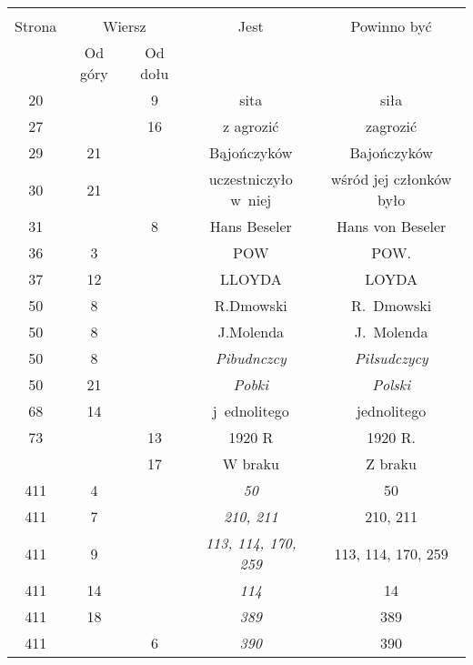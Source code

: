 \documentclass[a4paper,11pt]{article}
\begin{document}
\begin{center}
  \begin{tabular}{|c|c|c|c|c|}
    \hline
    & \multicolumn{2}{c|}{} & & \\
    Strona & \multicolumn{2}{c|}{Wiersz}& Jest & Powinno być \\ \cline{2-3}
    & Od góry & Od dołu &  &  \\ \hline
    20  & &  9 & sita & siła \\
    27  & & 16 & z agrozić & zagrozić \\
    29  & 21 & & Bąjończyków & Bajończyków \\
    30  & 21 & & uczestniczyło w~niej & wśród jej członków było \\
    31  & &  8 & Hans Beseler & Hans von Beseler \\
    36  &  3 & & POW & POW. \\
    37  & 12 & & LLOYDA & LOYDA \\
    50  &  8 & & R.Dmowski & R.~Dmowski \\
    50  &  8 & & J.Molenda & J.~Molenda \\
    50  &  8 & & \emph{Pibudnczcy} & \emph{Piłsudczycy} \\
    50  & 21 & & \emph{Pobki} & \emph{Polski} \\
    68  & 14 & & j~ednolitego & jednolitego \\
    73  & & 13 & 1920 R & 1920 R. \\
    & & 17 & W braku & Z braku \\
    411 &  4 & & \emph{50} & 50 \\
    411 &  7 & & \emph{210, 211} & 210, 211 \\
    411 &  9 & & \emph{113, 114, 170, 259} & 113, 114, 170, 259 \\
    411 & 14 & & \emph{114} & 14 \\
    411 & 18 & & \emph{389} & 389 \\
    411 & &  6 & \emph{390} & 390 \\

\end{tabular}
\end{center}
\end{document}

